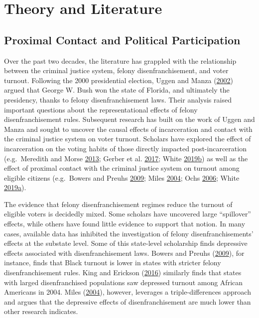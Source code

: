 \documentclass[
  12pt,
]{article}
\begin{document}
\hypertarget{theory-and-literature}{%
\section*{Theory and Literature}\label{theory-and-literature}}

\hypertarget{proximal-contact-and-political-participation}{%
\subsection*{Proximal Contact and Political Participation}\label{proximal-contact-and-political-participation}}

Over the past two decades, the literature has grappled with the relationship between the criminal justice system, felony disenfranchisement, and voter turnout. Following the 2000 presidential election, Uggen and Manza (\protect\hyperlink{ref-Uggen2002}{2002}) argued that George W. Bush won the state of Florida, and ultimately the presidency, thanks to felony disenfranchisement laws. Their analysis raised important questions about the representational effects of felony disenfranchisement rules. Subsequent research has built on the work of Uggen and Manza and sought to uncover the causal effects of incarceration and contact with the criminal justice system on voter turnout. Scholars have explored the effect of incarceration on the voting habits of those directly impacted post-incarceration (e.g.~Meredith and Morse \protect\hyperlink{ref-Meredith2013}{2013}; Gerber et al. \protect\hyperlink{ref-Gerber2017}{2017}; White \protect\hyperlink{ref-White2019}{2019}\protect\hyperlink{ref-White2019}{b}) as well as the effect of proximal contact with the criminal justice system on turnout among eligible citizens (e.g.~Bowers and Preuhs \protect\hyperlink{ref-Bowers2009}{2009}; Miles \protect\hyperlink{ref-Miles2004}{2004}; Ochs \protect\hyperlink{ref-Ochs2006}{2006}; White \protect\hyperlink{ref-White2019a}{2019}\protect\hyperlink{ref-White2019a}{a}).

The evidence that felony disenfranchisement regimes reduce the turnout of eligible voters is decidedly mixed. Some scholars have uncovered large ``spillover'' effects, while others have found little evidence to support that notion. In many cases, available data has inhibited the investigation of felony disenfranchisements' effects at the substate level. Some of this state-level scholarship finds depressive effects associated with disenfranchisement laws. Bowers and Preuhs (\protect\hyperlink{ref-Bowers2009}{2009}), for instance, finds that Black turnout is lower in states with stricter felony disenfranchisement rules. King and Erickson (\protect\hyperlink{ref-King2016}{2016}) similarly finds that states with larged disenfranchised populations saw depressed turnout among African Americans in 2004. Miles (\protect\hyperlink{ref-Miles2004}{2004}), however, leverages a triple-differences approach and argues that the depressive effects of disenfranchisement are much lower than other research indicates.
\end{document}
